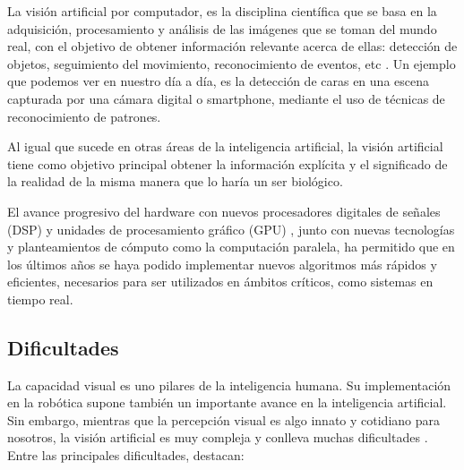 

La visión artificial por computador, es la disciplina científica que se basa en
la adquisición, procesamiento y análisis de las imágenes que se toman del mundo
real, con el objetivo de obtener información relevante acerca de ellas:
detección de objetos, seguimiento del movimiento, reconocimiento de eventos, etc
\cite{VisionArtificial}. Un ejemplo que podemos ver en nuestro día a día, es la
detección de caras en una escena capturada por una cámara digital o smartphone,
mediante el uso de técnicas de reconocimiento de patrones.

Al igual que sucede en otras áreas de la inteligencia artificial, la visión
artificial tiene como objetivo principal obtener la información explícita y el
significado de la realidad de la misma manera que lo haría un ser biológico.

El avance progresivo del hardware con nuevos procesadores digitales de señales
(DSP) y unidades de procesamiento gráfico (GPU) \cite{VisionArtificialGPU},
junto con nuevas tecnologías y planteamientos de cómputo como la computación
paralela, ha permitido que en los últimos años se haya podido implementar nuevos
algoritmos más rápidos y eficientes, necesarios para ser utilizados en ámbitos
críticos, como sistemas en tiempo real.

\subsection{Dificultades} La capacidad visual es uno pilares de la inteligencia
humana. Su implementación en la robótica supone también un importante avance en
la inteligencia artificial. Sin embargo, mientras que la percepción visual es
algo innato y cotidiano para nosotros, la visión artificial es muy compleja y
conlleva muchas dificultades \cite{VisionPorComputador}. Entre las principales
dificultades, destacan:

